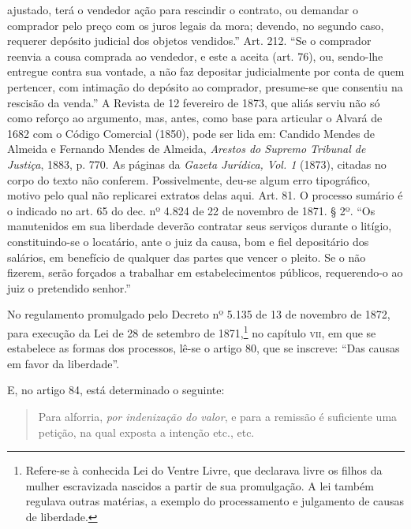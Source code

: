 {  ajustado, terá o vendedor ação para rescindir o contrato, ou demandar
  o comprador pelo preço com os juros legais da mora; devendo, no
  segundo caso, requerer depósito judicial dos objetos vendidos.'' Art.
  212. ``Se o comprador reenvia a cousa comprada ao vendedor, e este a
  aceita (art. 76), ou, sendo-lhe entregue contra sua vontade, a não faz
  depositar judicialmente por conta de quem pertencer, com intimação do
  depósito ao comprador, presume-se que consentiu na rescisão da venda.''
  A Revista de 12 fevereiro de 1873, que aliás serviu não só como
  reforço ao argumento, mas, antes, como base para articular o
  Alvará de 1682 com o Código Comercial (1850), pode ser lida em: 
 Candido Mendes de Almeida e Fernando Mendes de Almeida,
 \emph{Arestos do Supremo Tribunal de Justiça}, 1883, p. 770. As páginas da
  \emph{Gazeta Jurídica, Vol. 1} (1873), citadas no corpo do texto não
  conferem. Possivelmente, deu-se algum erro tipográfico, motivo pelo
  qual não replicarei extratos delas aqui. Art. 81. O processo sumário é
  o indicado no art. 65 do dec. nº 4.824 de 22 de novembro de 1871. § 2º. ``Os
  manutenidos em sua liberdade deverão contratar seus serviços durante o
  litígio, constituindo-se o locatário, ante o juiz da causa, bom e fiel
  depositário dos salários, em benefício de qualquer das partes que
  vencer o pleito. Se o não fizerem, serão forçados a trabalhar em
  estabelecimentos públicos, requerendo-o ao juiz o pretendido senhor.''}

No regulamento promulgado pelo Decreto nº 5.135 de 13 de novembro de
1872, para execução da Lei de 28 de setembro de 1871,\footnote{
  Refere-se à conhecida Lei do Ventre Livre, que declarava livre os
  filhos da mulher escravizada nascidos a partir de sua promulgação.
  A lei também regulava outras matérias, a exemplo do processamento
  e julgamento de causas de liberdade.} no capítulo \textsc{vii}, em que se
estabelece as formas dos processos, lê-se o artigo 80, que se inscreve:
``Das causas em favor da liberdade''.

E, no artigo 84, está determinado o seguinte:

\begin{quote}
Para alforria, \emph{por indenização do valor}, e para a remissão é
suficiente uma petição, na qual exposta a intenção etc., etc.
\end{quote}

